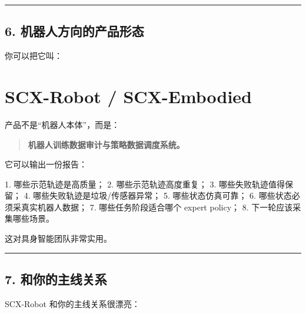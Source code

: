 \documentclass[
  12pt,
]{ctexart}
\newenvironment{Shaded}{}{}
\newcommand{\NormalTok}[1]{#1}
\begin{document}
\begin{center}\rule{0.5\linewidth}{0.5pt}\end{center}

\subsection{6.
机器人方向的产品形态}\label{ux673aux5668ux4ebaux65b9ux5411ux7684ux4ea7ux54c1ux5f62ux6001}

你可以把它叫：

\section{\texorpdfstring{\textbf{SCX-Robot /
SCX-Embodied}}{SCX-Robot / SCX-Embodied}}\label{scx-robot-scx-embodied}

产品不是``机器人本体''，而是：

\begin{quote}
\textbf{机器人训练数据审计与策略数据调度系统。}
\end{quote}

它可以输出一份报告：

\begin{Shaded}
\begin{Highlighting}[]
\NormalTok{1. 哪些示范轨迹是高质量；}
\NormalTok{2. 哪些示范轨迹高度重复；}
\NormalTok{3. 哪些失败轨迹值得保留；}
\NormalTok{4. 哪些失败轨迹是垃圾/传感器异常；}
\NormalTok{5. 哪些状态仿真可靠；}
\NormalTok{6. 哪些状态必须采真实机器人数据；}
\NormalTok{7. 哪些任务阶段适合哪个 expert policy；}
\NormalTok{8. 下一轮应该采集哪些场景。}
\end{Highlighting}
\end{Shaded}

这对具身智能团队非常实用。

\begin{center}\rule{0.5\linewidth}{0.5pt}\end{center}

\subsection{7.
和你的主线关系}\label{ux548cux4f60ux7684ux4e3bux7ebfux5173ux7cfb}

SCX-Robot 和你的主线关系很漂亮：
\end{document}
